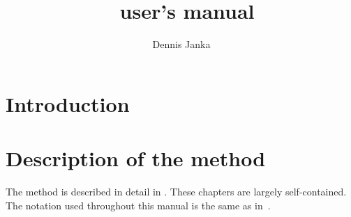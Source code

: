 \documentclass[	11pt,
				a4paper,
				abstract=true,
				twoside=true,
				bibliography=totoc, 
				headinclude=true,
				footinclude=false]{scrartcl}
\title{\blockSQP\ user's manual}
\author{Dennis Janka}
\begin{document}
\maketitle
\tableofcontents
\clearpage
\section{Introduction}


\section{Description of the method}
The method is described in detail in \cite[Chapters 6--8]{Janka2015}. These chapters are largely self-contained. The notation used throughout this manual is the same as in~\cite{Janka2015}.


\end{document}
